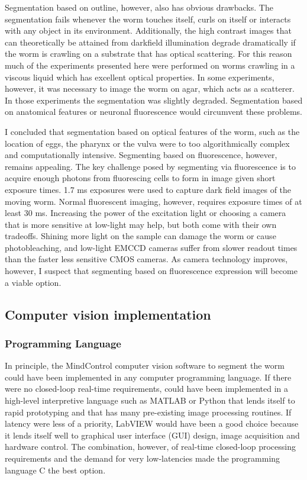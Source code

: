 	Segmentation based on outline, however, also has obvious drawbacks. The segmentation fails whenever the worm touches itself, curls on itself or interacts with any object in its environment. Additionally, the high contrast images that can theoretically be attained from darkfield illumination degrade dramatically if the worm is crawling on a substrate that has optical scattering. For this reason much of the experiments presented here were performed on worms crawling in a viscous liquid  which has excellent optical properties.  In some experiments, however, it was necessary to image the worm on agar, which acts as a scatterer. In those experiments the segmentation was slightly degraded. Segmentation based on anatomical features or neuronal fluorescence would circumvent these problems. 
	
	I concluded that segmentation based on optical features of the worm, such as the location of eggs, the pharynx or the vulva were to too algorithmically complex and computationally intensive. Segmenting based on fluorescence, however,  remains appealing. The key challenge posed by segmenting via fluorescence is to acquire enough photons from fluorescing cells to form in image given short exposure times. 1.7 ms exposures were used to capture dark field images of the moving worm. Normal fluorescent imaging, however, requires exposure times of at least 30 ms. Increasing the power of the excitation light or choosing a camera that is more sensitive at low-light may help, but both come with their own tradeoffs. Shining more light on the sample can damage the worm or cause photobleaching, and low-light EMCCD cameras suffer from slower readout times than the faster less sensitive CMOS cameras. As camera technology improves, however, I suspect that segmenting based on fluorescence expression will become a viable option.
	
\subsection{Computer vision implementation}
\subsubsection{Programming Language}
In principle, the MindControl computer vision software to segment the worm could have been implemented in any computer programming language. If there were no closed-loop real-time requirements, could have been implemented in a high-level interpretive language such as MATLAB or Python that lends itself to rapid prototyping and that has many pre-existing image processing routines. If latency were less of a priority,  LabVIEW would have been a good choice because it  lends itself well to graphical user interface (GUI) design, image acquisition and hardware control. The combination, however, of real-time closed-loop processing requirements and the demand for very low-latencies made the programming language C the best option. 

